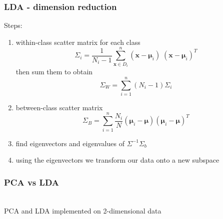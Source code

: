 \begin{frame}
	\frametitle{LDA - dimension reduction}
Steps:
\begin{enumerate}
	\item within-class scatter matrix for each class
	\begin{equation}
	\Sigma_i = \frac{1}{N_{i}-1} \sum\limits_{\pmb x \in D_i}^n (\pmb x - \pmb \mu_i)\;(\pmb x - \pmb \mu_i)^T
	\end{equation} 
	then sum them to obtain
	\begin{equation}
	\Sigma_W = \sum\limits_{i =1}^{n} (N_i - 1) \Sigma_i 
	\end{equation}
	
	\item between-class scatter matrix
	 \begin{equation}
	\Sigma_B = \sum\limits_{i =1}^n \dfrac{N_i}{N} (\pmb \mu_i - \pmb \mu) (\pmb \mu_i - \pmb \mu)^T
	\end{equation}
	
	\item find eigenvectors and eigenvalues of $\Sigma^{-1} \Sigma_b$
	\item using the eigenvectors we transform our data onto a new subspace
\end{enumerate}
\end{frame}

\begin{frame}
\frametitle{PCA vs LDA}
\begin{center}
	\centering
	\caption{\\PCA and LDA implemented on 2-dimensional data}
\end{center}
\end{frame}


